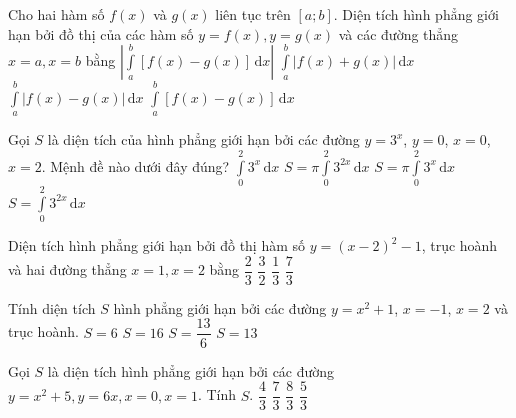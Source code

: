 \begin{ex}%
	Cho hai hàm số $f(x)$ và $g(x)$ liên tục trên $[a;b]$. Diện tích hình phẳng giới hạn bởi đồ thị của các hàm số $y=f(x), y=g(x)$ và các đường thẳng $x=a, x=b$ bằng
\choice
{$\left|\displaystyle\int\limits_a^b \left[f(x)-g(x)\right]\mathrm{\,d}x\right|$}
{$\displaystyle\int\limits_a^b \left|f(x)+g(x)\right|\mathrm{\,d}x$}
{\True $\displaystyle\int\limits_a^b \left|f(x)-g(x)\right|\mathrm{\,d}x$}
{$\displaystyle\int\limits_a^b \left[f(x)-g(x)\right]\mathrm{\,d}x$}
\end{ex}
\begin{ex}%
	Gọi $S$ là diện tích của hình phẳng giới hạn bởi các đường $y=3^x$, $y=0$, $x=0$, $x=2$. Mệnh đề nào dưới đây đúng?
\choice
{\True $\displaystyle\int\limits_0^2 3^x\mathrm{\,d}x$}
{$S=\pi\displaystyle\int\limits_0^2 3^{2x}\mathrm{\,d}x$}
{$S=\pi\displaystyle\int\limits_0^2 3^x\mathrm{\,d}x$}
{$S=\displaystyle\int\limits_0^2 3^{2x}\mathrm{\,d}x$}

\end{ex}%
\begin{ex}%
	Diện tích hình phẳng giới hạn bởi đồ thị hàm số $y=(x-2)^2-1$, trục hoành và hai đường thẳng $x=1, x=2$ bằng
\choice
{\True $\dfrac{2}{3}$}
{$\dfrac{3}{2}$}
{$\dfrac{1}{3}$}
{$\dfrac{7}{3}$}

\end{ex}
\begin{ex}%
	Tính diện tích $S$ hình phẳng giới hạn bởi các đường $y=x^2+1$, $x=-1$, $x=2$ và trục hoành.
\choice
{\True $S=6$}
{$S=16$}
{$S=\dfrac{13}{6}$}
{$S=13$}
\end{ex}
\begin{ex}%
	Gọi $S$ là diện tích hình phẳng giới hạn bởi các đường $y=x^2+5, y=6 x, x=0, x=1$. Tính $S$.
\choice
{$\dfrac{4}{3}$}
{\True $\dfrac{7}{3}$}
{$\dfrac{8}{3}$}
{$\dfrac{5}{3}$}
\end{ex}
